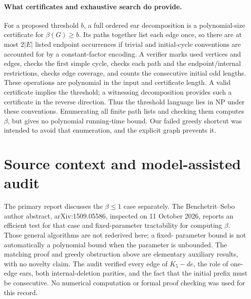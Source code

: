 \documentclass[11pt]{article}
\begin{document}
\paragraph{What certificates and exhaustive search do provide.}
For a proposed threshold $b$, a full ordered ear decomposition is a
polynomial-size certificate for $\beta(G)\ge b$. Its paths together list each
edge once, so there are at most $2|E|$ listed endpoint occurrences if trivial
and initial-cycle conventions are accounted for by a constant-factor encoding.
A verifier marks used vertices and edges, checks the first simple cycle,
checks each path and the endpoint/internal restrictions, checks edge coverage,
and counts the consecutive initial odd lengths. These operations are polynomial
in the input and certificate length. A valid certificate implies the threshold;
a witnessing decomposition provides such a certificate in the reverse direction.
Thus the threshold language lies in NP under these conventions. Enumerating
all finite path lists and checking them computes $\beta$, but gives no
polynomial running-time bound. Our failed greedy shortcut was intended to
avoid that enumeration, and the explicit graph prevents it.

\section{Source context and model-assisted audit}
The primary report discusses the $\beta\le1$ case separately. The
Benchetrit--Sebo author abstract, arXiv:1509.05586, inspected on 11 October 2026,
reports an efficient test for that case and fixed-parameter tractability for
computing $\beta$. Those general algorithms are not rederived here; a fixed-
parameter bound is not automatically a polynomial bound when the parameter
is unbounded. The matching proof and greedy obstruction above are elementary
auxiliary results, with no novelty claim. The audit verified every edge of
$K_5-de$, the role of one-edge ears, both internal-deletion parities, and the
fact that the initial prefix must be consecutive. No numerical computation
or formal proof checking was used for this record.
\end{document}
